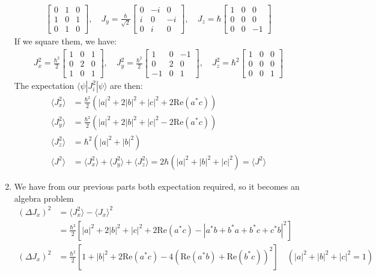 \documentclass[letterpaper,11pt,twoside]{article}
\newcommand{\braket}[1]{\langle#1\rangle}
\newcommand{\re}[1]{\text{Re}\left(#1\right)}
\begin{document}
\begin{enumerate}[itemsep=0pt,topsep=0pt,label=\alph*)]
\begin{align*}
\begin{bmatrix}
      0&1&0\\1&0&1\\0&1&0
    \end{bmatrix},\quad J_y=\frac{\hbar}{\sqrt{2}}\begin{bmatrix}
      0&-i&0\\i&0&-i\\0&i&0
    \end{bmatrix},\quad J_z=\hbar\begin{bmatrix}
      1&0&0\\0&0&0\\0&0&-1
    \end{bmatrix}
  \end{align*}
  If we square them, we have:
  \begin{align*}
    J_x^2=\frac{\hbar^2}{2}\begin{bmatrix}
      1&0&1\\0&2&0\\1&0&1
    \end{bmatrix},\quad 
    J_y^2=\frac{\hbar^2}{2}\begin{bmatrix}
      1&0&-1\\0&2&0\\-1&0&1
    \end{bmatrix},\quad 
    J_z^2=\hbar^2\begin{bmatrix}
      1&0&0\\0&0&0\\0&0&1
    \end{bmatrix}
  \end{align*}
  The expectation $\braket{\psi|J^2_{i}|\psi}$ are then:
  \begin{align*}
    \braket{J_x^2}&=\frac{\hbar^2}{2}(|a|^2+2|b|^2+|c|^2+2\re{a^*c})\\
    \braket{J_y^2}&=\frac{\hbar^2}{2}(|a|^2+2|b|^2+|c|^2-2\re{a^*c})\\
    \braket{J_z^2}&=\hbar^2(|a|^2+|b|^2)\\
    \braket{J^2}&=\braket{J_x^2}+\braket{J_y^2}+\braket{J_z^2}=2\hbar(|a|^2+|b|^2+|c|^2)=\braket{J^2}
  \end{align*} 
  \item We have from our previous parts both expectation required, so it becomes an algebra problem
  \begin{align*}
    (\Delta J_x)^2&=\braket{J_x^2}-\braket{J_x}^2\\
    &=\frac{\hbar^2}{2}[|a|^2+2|b|^2+|c|^2+2\re{a^*c}-|a^*b+b^*a+b^*c+c^*b|^2]\\
    (\Delta J_x)^2&=\frac{\hbar^2}{2}[1+|b|^2+2\re{a^*c}-4(\re{a^*b}+\re{b^*c})^2]\quad(|a|^2+|b|^2+|c|^2=1)

\end{align*}
\end{enumerate}
\end{document}
